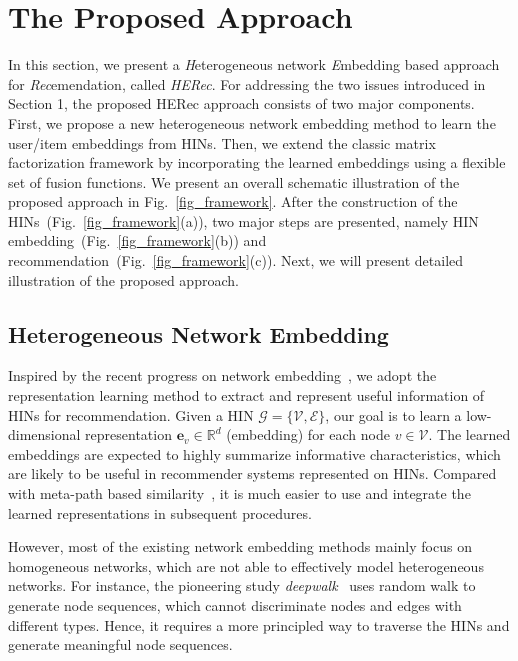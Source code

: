 \section{The Proposed Approach \label{sec-model}}

In this section, we present a \emph{H}eterogeneous network \emph{E}mbedding based  approach for \emph{Rec}emendation, called  \emph{HERec}.
For addressing the two issues introduced in Section 1, the proposed HERec approach consists of two major components.
First, we propose a new heterogeneous network embedding method to learn the user/item embeddings from HINs.
Then, we extend the classic matrix factorization framework by incorporating the learned embeddings using a flexible set of fusion functions.
We present an overall schematic illustration of the proposed approach in Fig.~\ref{fig_framework}.
After the construction of the HINs~(Fig.~\ref{fig_framework}(a)), two major steps are presented,  namely HIN embedding~(Fig.~\ref{fig_framework}(b)) and recommendation~(Fig.~\ref{fig_framework}(c)). Next, we will present detailed illustration of the proposed approach.

\subsection{Heterogeneous Network Embedding}
Inspired by the recent progress on network embedding~\cite{perozzi2014deepwalk,grover2016node2vec}, we adopt the representation learning method to extract and represent useful information of HINs for recommendation. Given a HIN $\mathcal{G} = \{\mathcal{V}, \mathcal{E}\}$, our goal is to learn a low-dimensional representation $\bm{e}_v \in \mathbb{R}^d$ (\aka embedding) for each node $v \in \mathcal{V}$.
The learned embeddings are expected to highly summarize informative characteristics, which are likely to be useful in recommender systems represented on HINs.
Compared with meta-path based similarity~\cite{sun2011pathsim,shi2015semantic}, it is much easier to use and integrate the learned representations in subsequent procedures.

However, most of the existing network embedding methods mainly focus on homogeneous networks, which are not able to effectively model heterogeneous networks. For instance, the pioneering study \emph{deepwalk}~\cite{perozzi2014deepwalk} uses random walk to generate node sequences, which
cannot discriminate nodes and edges with different types. Hence, it requires a more principled way to traverse the HINs and generate meaningful node sequences.

